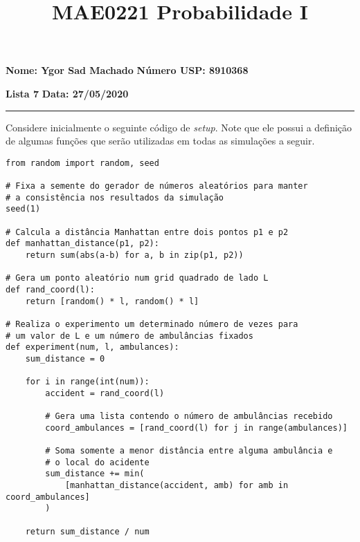 \documentclass[9.5pt,reqno,a4paper]{amsart}
\begin{document}
\parindent=0pt

\title[MAE0221]
{MAE0221 Probabilidade I}\vspace{3\jot}%


\maketitle
\thispagestyle{empty} 
\pagestyle{plain}
\onehalfspace

\textbf{Nome: Ygor Sad Machado}\hfill
\textbf{Número USP: 8910368}\null

\medskip
\textbf{Lista 7}\hfill
\textbf{Data: 27/05/2020}\null

\noindent\rule{\textwidth}{0.4pt}

\bigskip
Considere inicialmente o seguinte código de \textit{setup}. Note que ele possui a definição de algumas funções que serão utilizadas em todas as simulações a seguir.

\bigskip
\begin{verbatim}
from random import random, seed

# Fixa a semente do gerador de números aleatórios para manter
# a consistência nos resultados da simulação
seed(1)

# Calcula a distância Manhattan entre dois pontos p1 e p2
def manhattan_distance(p1, p2):
    return sum(abs(a-b) for a, b in zip(p1, p2))

# Gera um ponto aleatório num grid quadrado de lado L
def rand_coord(l):
    return [random() * l, random() * l]

# Realiza o experimento um determinado número de vezes para
# um valor de L e um número de ambulâncias fixados
def experiment(num, l, ambulances):
    sum_distance = 0

    for i in range(int(num)):
        accident = rand_coord(l)

        # Gera uma lista contendo o número de ambulâncias recebido
        coord_ambulances = [rand_coord(l) for j in range(ambulances)]

        # Soma somente a menor distância entre alguma ambulância e
        # o local do acidente
        sum_distance += min(
            [manhattan_distance(accident, amb) for amb in coord_ambulances]
        )

    return sum_distance / num
\end{verbatim}
\end{document}
